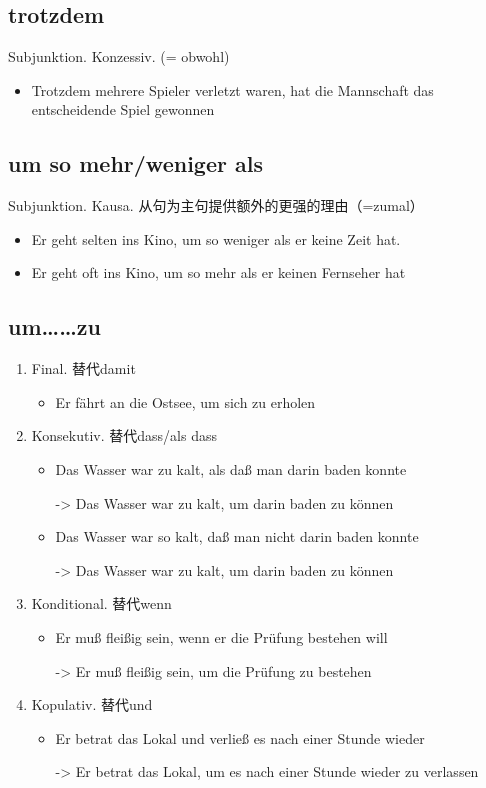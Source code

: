 \documentclass[UTF8]{report}
\begin{document}
\subsection{trotzdem}
Subjunktion. Konzessiv. (= obwohl)
\begin{itemize}
    \item Trotzdem mehrere Spieler verletzt waren, hat die Mannschaft das entscheidende Spiel gewonnen
\end{itemize}


\subsection{um so mehr/weniger als}
Subjunktion. Kausa. 从句为主句提供额外的更强的理由（=zumal）

\begin{itemize}
    \item Er geht selten ins Kino, um so weniger als er keine Zeit hat.
    \item Er geht oft ins Kino, um so mehr als er keinen Fernseher hat
\end{itemize}

\subsection{um……zu}
\begin{enumerate}
    \item Final. 替代damit
    \begin{itemize}
        \item Er fährt an die Ostsee, um sich zu erholen
    \end{itemize}
    \item Konsekutiv. 替代dass/als dass
    \begin{itemize}
        \item Das Wasser war zu kalt, als daß man darin baden konnte
        
        -> Das Wasser war zu kalt, um darin baden zu können
        \item Das Wasser war so kalt, daß man nicht darin baden konnte
        
        -> Das Wasser war zu kalt, um darin baden zu können
    \end{itemize}
    \item Konditional. 替代wenn
    \begin{itemize}
        \item Er muß fleißig sein, wenn er die Prüfung bestehen will
        
        ->  Er muß fleißig sein, um die Prüfung zu bestehen
    \end{itemize}
    \item Kopulativ. 替代und
    \begin{itemize}
        \item Er betrat das Lokal und verließ es nach einer Stunde wieder
        
        -> Er betrat das Lokal, um es nach einer Stunde wieder zu verlassen
    \end{itemize}
\end{enumerate}
\end{document}
